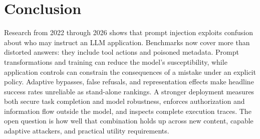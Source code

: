 \documentclass[conference]{IEEEtran}
\begin{document}
\section{Conclusion}
Research from 2022 through 2026 shows that prompt injection exploits confusion about who may instruct an LLM application. Benchmarks now cover more than distorted answers: they include tool actions and poisoned metadata. Prompt transformations and training can reduce the model's susceptibility, while application controls can constrain the consequences of a mistake under an explicit policy. Adaptive bypasses, false refusals, and representation effects make headline success rates unreliable as stand-alone rankings. A stronger deployment measures both secure task completion and model robustness, enforces authorization and information flow outside the model, and inspects complete execution traces. The open question is how well that combination holds up across new content, capable adaptive attackers, and practical utility requirements.
\end{document}
